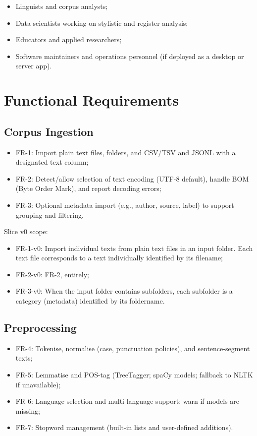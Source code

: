 \begin{itemize}
    \item Linguists and corpus analysts;
    \item Data scientists working on stylistic and register analysis;
    \item Educators and applied researchers;
    \item Software maintainers and operations personnel (if deployed as a desktop or server app).
\end{itemize}

\section{Functional Requirements}

\subsection{Corpus Ingestion}

\begin{itemize}
    \item FR-1: Import plain text files, folders, and CSV/TSV and JSONL with a designated text column;
    \item FR-2: Detect/allow selection of text encoding (UTF-8 default), handle BOM (Byte Order Mark), and report decoding errors;
    \item FR-3: Optional metadata import (e.g., author, source, label) to support grouping and filtering.
\end{itemize}

Slice v0 scope:

\begin{itemize}
    \item FR-1-v0: Import individual texts from plain text files in an input folder. Each text file corresponds to a text individually identified by its filename;
    \item FR-2-v0: FR-2, entirely;
    \item FR-3-v0: When the input folder contains subfolders, each subfolder is a category (metadata) identified by its foldername.
\end{itemize}

\subsection{Preprocessing}

\begin{itemize}
    \item FR-4: Tokenise, normalise (case, punctuation policies), and sentence-segment texts;
    \item FR-5: Lemmatise and POS-tag (TreeTagger; spaCy models; fallback to NLTK if unavailable);
    \item FR-6: Language selection and multi-language support; warn if models are missing;
    \item FR-7: Stopword management (built-in lists and user-defined additions).
\end{itemize}


